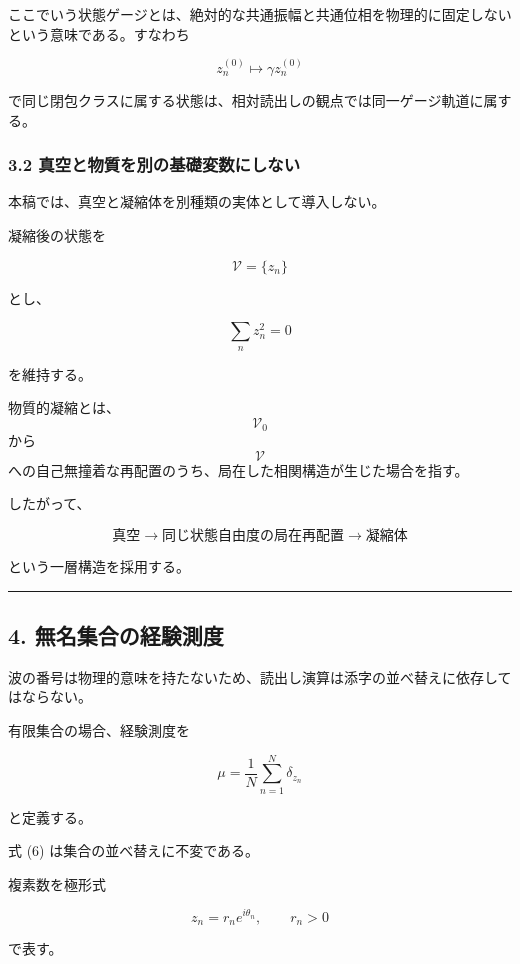 \documentclass[
  a4paper,
]{ltjsarticle}
\begin{document}
ここでいう状態ゲージとは、絶対的な共通振幅と共通位相を物理的に固定しないという意味である。すなわち

\[
z_n^{(0)}
\mapsto
\gamma z_n^{(0)}
\]

で同じ閉包クラスに属する状態は、相対読出しの観点では同一ゲージ軌道に属する。

\subsubsection{3.2
真空と物質を別の基礎変数にしない}\label{ux771fux7a7aux3068ux7269ux8ceaux3092ux5225ux306eux57faux790eux5909ux6570ux306bux3057ux306aux3044}

本稿では、真空と凝縮体を別種類の実体として導入しない。

凝縮後の状態を

\[
\mathcal V
=
\{z_n\}
\]

とし、

\[
\sum_n z_n^2=0
\tag{5}
\]

を維持する。

物質的凝縮とは、\[\mathcal V_0\] から \[\mathcal V\]
への自己無撞着な再配置のうち、局在した相関構造が生じた場合を指す。

したがって、

\[
\boxed{
\text{真空}
\longrightarrow
\text{同じ状態自由度の局在再配置}
\longrightarrow
\text{凝縮体}
}
\]

という一層構造を採用する。

\begin{center}\rule{0.5\linewidth}{0.5pt}\end{center}

\subsection{4.
無名集合の経験測度}\label{ux7121ux540dux96c6ux5408ux306eux7d4cux9a13ux6e2cux5ea6}

波の番号は物理的意味を持たないため、読出し演算は添字の並べ替えに依存してはならない。

有限集合の場合、経験測度を

\[
\mu
=
\frac1N
\sum_{n=1}^{N}
\delta_{z_n}
\tag{6}
\]

と定義する。

式 (6) は集合の並べ替えに不変である。

複素数を極形式

\[
z_n
=
r_n e^{i\theta_n},
\qquad
r_n>0
\]

で表す。
\end{document}
